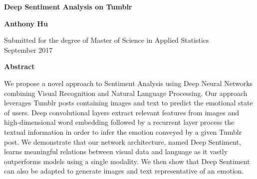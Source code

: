 \newpage
\thispagestyle{plain}
\begin{center}
  \textbf{\Large Deep Sentiment Analysis on Tumblr}

  \vspace*{1cm}
  \textbf{\large Anthony Hu}

  \vspace*{0.5cm}
  {\large Submitted for the degree of Master of Science in Applied Statistics\\ September 2017}

  \vspace*{1cm}
  \textbf{\large Abstract}
\end{center}
We propose a novel approach to Sentiment Analysis using Deep Neural Networks combining Visual Recognition and Natural Language Processing. Our approach leverages Tumblr posts containing images and text to predict the emotional state of users. Deep convolutional layers extract relevant features from images and high-dimensional word embedding followed by a recurrent layer process the textual information in order to infer the emotion conveyed by a given Tumblr post. We demonstrate that our network architecture, named Deep Sentiment, learns meaningful relations between visual data and language as it vastly outperforms models using a single modality. We then show that Deep Sentiment can also be adapted to generate images and text representative of an emotion. 

\begin{spacing}{0.95}
\tableofcontents
\end{spacing}
\listoffigures
\listoftables
\clearpage












